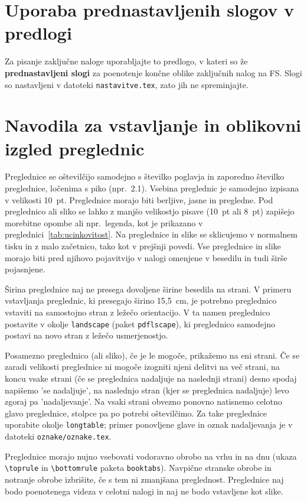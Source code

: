 \section*{Uporaba prednastavljenih slogov v predlogi}
Za pisanje zaključne naloge uporabljajte to predlogo, v kateri so že \textbf{prednastavljeni slogi} za poenotenje končne oblike zaključnih nalog na FS. Slogi so nastavljeni v datoteki \texttt{nastavitve.tex}, zato jih ne spreminjajte. 
\section*{Navodila za vstavljanje in oblikovni izgled preglednic}
Preglednice se oštevilčijo samodejno s številko poglavja in zaporedno številko preglednice, ločenima s piko (npr.~2.1). Vsebina preglednic je samodejno izpisana v velikosti 10~pt. Preglednice morajo biti berljive, jasne in pregledne. Pod preglednico ali sliko se lahko z manjšo velikostjo pisave (10~pt ali 8~pt) zapišejo morebitne opombe ali npr.~legenda, kot je prikazano v preglednici~\ref{tab:ucinkovitost}. Na preglednice in slike se sklicujemo v normalnem tisku in z malo začetnico, tako kot v prejšnji povedi. Vse preglednice in slike morajo biti pred njihovo pojavitvijo v nalogi omenjene v besedilu in tudi širše pojasnjene.

Širina preglednice naj ne presega dovoljene širine besedila na strani. V primeru vstavljanja preglednic, ki presegajo širino 15,5~cm, je potrebno preglednico vstaviti na samostojno stran z ležečo orientacijo. V ta namen preglednico postavite v okolje \verb|landscape| (paket \texttt{pdflscape}), ki preglednico samodejno postavi na novo stran z ležečo usmerjenostjo.

Posamezno preglednico (ali sliko), če je le mogoče, prikažemo na eni strani. Če se zaradi velikosti preglednice ni mogoče izogniti njeni delitvi na več strani, na koncu vsake strani (če se preglednica nadaljuje na naslednji strani) desno spodaj napišemo 'se nadaljuje', na naslednjo stran (kjer se preglednica nadaljuje) levo zgoraj pa 'nadaljevanje'. Na vsaki strani obvezno ponovno natisnemo celotno glavo preglednice, stolpce pa po potrebi oštevilčimo. Za take preglednice uporabite okolje \verb|longtable|; primer ponovljene glave in oznak nadaljevanja je v datoteki \texttt{oznake/oznake.tex}.

Preglednice morajo nujno vsebovati vodoravno obrobo na vrhu in na dnu (ukaza \verb|\toprule| in \verb|\bottomrule| paketa \texttt{booktabs}). Navpične stranske obrobe in notranje obrobe izbrišite, če s tem ni zmanjšana preglednost. Preglednice naj bodo poenotenega videza v celotni nalogi in naj ne bodo vstavljene kot slike.

